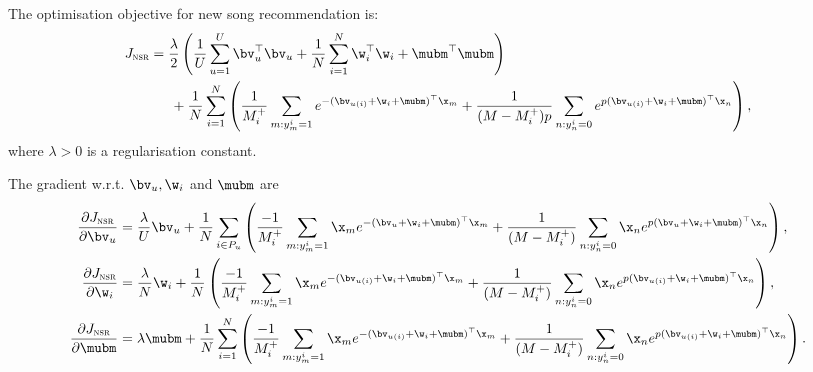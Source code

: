 The optimisation objective for new song recommendation is:
\begin{equation*}
\begin{aligned}
J_\textsc{nsr} &= \frac{\lambda}{2} \left( \frac{1}{U} \sum_{u=1}^U \bv_u^\top \bv_u 
     + \frac{1}{N} \sum_{i=1}^N \w_i^\top \w_i + \mubm^\top \mubm \right) \\
& \hspace{1.5em}
     + \frac{1}{N} \sum_{i=1}^N \left( \frac{1}{M_i^+} \sum_{m: y_m^i = 1} e^{-(\bv_{u(i)} + \w_i + \mubm)^\top \x_m} 
     + \frac{1}{(M - M_i^+) p} \sum_{n: y_n^i = 0} e^{p (\bv_{u(i)} + \w_i + \mubm)^\top \x_n} \right),
\end{aligned}
\end{equation*}
where $\lambda > 0$ is a regularisation constant.


The gradient w.r.t. $\bv_u, \w_i$ and $\mubm$ are
\begin{equation*}
\begin{aligned}
\frac{\partial J_\textsc{nsr}}{\partial \bv_u}
&= \frac{\lambda}{U} \bv_u + \frac{1}{N} \sum_{i \in P_u} \left( 
   \frac{-1}{M_i^+} \sum_{m: y_m^i = 1} \x_m e^{-(\bv_{u} + \w_i + \mubm)^\top \x_m} 
   + \frac{1}{(M - M_i^+)} \sum_{n: y_n^i = 0} \x_n e^{p (\bv_{u} + \w_i + \mubm)^\top \x_n} \right), \\
\frac{\partial J_\textsc{nsr}}{\partial \w_i}
&= \frac{\lambda}{N} \w_i + \frac{1}{N} \left( 
   \frac{-1}{M_i^+} \sum_{m: y_m^i = 1} \x_m e^{-(\bv_{u(i)} + \w_i + \mubm)^\top \x_m} 
   + \frac{1}{(M - M_i^+)} \sum_{n: y_n^i = 0} \x_n e^{p (\bv_{u(i)} + \w_i + \mubm)^\top \x_n} \right), \\
\frac{\partial J_\textsc{nsr}}{\partial \mubm}
&= \lambda \mubm + \frac{1}{N} \sum_{i=1}^N \left( 
   \frac{-1}{M_i^+} \sum_{m: y_m^i = 1} \x_m e^{-(\bv_{u(i)} + \w_i + \mubm)^\top \x_m} 
   + \frac{1}{(M - M_i^+)} \sum_{n: y_n^i = 0} \x_n e^{p (\bv_{u(i)} + \w_i + \mubm)^\top \x_n} \right).
\end{aligned}
\end{equation*}
